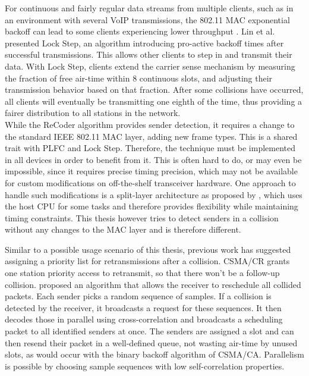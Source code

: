 For continuous and fairly regular data streams from multiple clients, such as in an environment with several VoIP transmissions, the 802.11 \gls{MAC} exponential backoff can lead to some clients experiencing lower throughput \cite{lin2009}. Lin et al. presented Lock Step, an algorithm introducing pro-active backoff times after successful transmissions. This allows other clients to step in and transmit their data. With Lock Step, clients extend the carrier sense mechanism by measuring the fraction of free air-time within 8 continuous slots, and adjusting their transmission behavior based on that fraction. After some collisions have occurred, all clients will eventually be transmitting one eighth of the time, thus providing a fairer distribution to all stations in the network.\\

While the ReCoder algorithm provides sender detection, it requires a change to the standard IEEE 802.11 \gls{MAC} layer, adding new frame types. This is a shared trait with \gls{PLFC} and Lock Step. Therefore, the technique must be implemented in all devices in order to benefit from it. This is often hard to do, or may even be impossible, since it requires precise timing precision, which may not be available for custom modifications on off-the-shelf transceiver hardware. One approach to handle such modifications is a split-layer architecture as proposed by \cite{nychis2009}, which uses the host CPU for some tasks and therefore provides flexibility while maintaining timing constraints. This thesis however tries to detect senders in a collision without any changes to the \gls{MAC} layer and is therefore different.

Similar to a possible usage scenario of this thesis, previous work has suggested assigning a priority list for retransmissions after a collision. \gls{CSMA/CR} \cite{choi2013} grants one station priority access to retransmit, so that there won't be a follow-up collision. \cite{zhao2015} proposed an algorithm that allows the receiver to reschedule all collided packets. Each sender picks a random sequence of samples. If a collision is detected by the receiver, it broadcasts a request for these sequences. It then decodes those in parallel using cross-correlation and broadcasts a scheduling packet to all identified senders at once. The senders are assigned a slot and can then resend their packet in a well-defined queue, not wasting air-time by unused slots, as would occur with the binary backoff algorithm of \gls{CSMA/CA}. Parallelism is possible by choosing sample sequences with low self-correlation properties.


